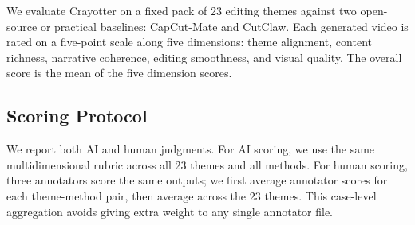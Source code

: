 ﻿\documentclass[11pt]{article}
\begin{document}
We evaluate Crayotter on a fixed pack of 23 editing themes against two
open-source or practical baselines: CapCut-Mate and CutClaw. Each generated
video is rated on a five-point scale along five dimensions: theme alignment,
content richness, narrative coherence, editing smoothness, and visual quality.
The overall score is the mean of the five dimension scores.

\begin{table}[t]
\caption{Human evaluation by dimension. Each cell is averaged over three
annotators and 23 themes.}
\label{tab:eval_dims}
\centering
{}
\end{table}

\subsection{Scoring Protocol}

We report both AI and human judgments. For AI scoring, we use the same
multidimensional rubric across all 23 themes and all methods. For human
scoring, three annotators score the same outputs; we first average annotator
scores for each theme-method pair, then average across the 23 themes. This
case-level aggregation avoids giving extra weight to any single annotator file.

\begin{table}[t]
\caption{Overall comparison on 23 themes. Scores are mean $\pm$ standard
deviation across themes on a 1--5 scale.}
\label{tab:eval_main}
\centering
{}
\end{table}
\end{document}
